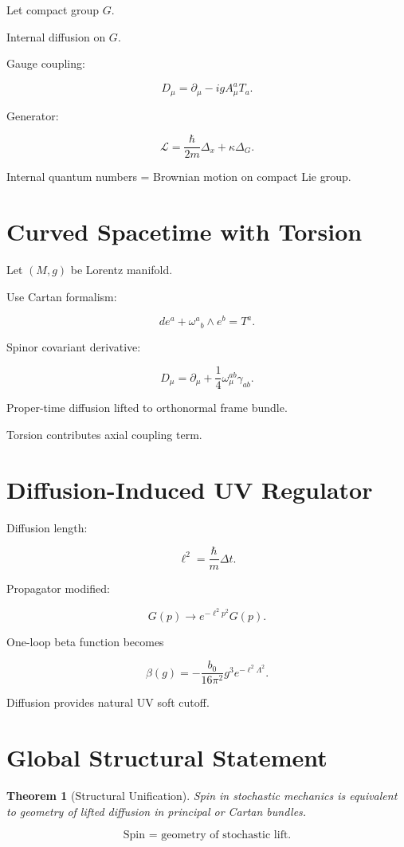 \documentclass[11pt]{article}
\newtheorem{theorem}{Theorem}
\begin{document}
Let compact group $G$.

Internal diffusion on $G$.

Gauge coupling:

\[
D_\mu = \partial_\mu - igA_\mu^a T_a.
\]

Generator:

\[
\mathcal{L}
=
\frac{\hbar}{2m}\Delta_x
+
\kappa\Delta_G.
\]

Internal quantum numbers =
Brownian motion on compact Lie group.

\section{Curved Spacetime with Torsion}

Let $(M,g)$ be Lorentz manifold.

Use Cartan formalism:

\[
de^a + \omega^a{}_b\wedge e^b = T^a.
\]

Spinor covariant derivative:

\[
D_\mu = \partial_\mu
+ \frac14\omega_\mu^{ab}\gamma_{ab}.
\]

Proper-time diffusion lifted to orthonormal frame bundle.

Torsion contributes axial coupling term.

\section{Diffusion-Induced UV Regulator}

Diffusion length:

\[
\ell^2 = \frac{\hbar}{m}\Delta t.
\]

Propagator modified:

\[
G(p)\to e^{-\ell^2 p^2}G(p).
\]

One-loop beta function becomes

\[
\beta(g)
=
-\frac{b_0}{16\pi^2}g^3 e^{-\ell^2\Lambda^2}.
\]

Diffusion provides natural UV soft cutoff.

\section{Global Structural Statement}

\begin{theorem}[Structural Unification]
Spin in stochastic mechanics is equivalent to
geometry of lifted diffusion in principal or Cartan bundles.
\end{theorem}

\[
\boxed{
\text{Spin = geometry of stochastic lift.}
}
\]
\end{document}
